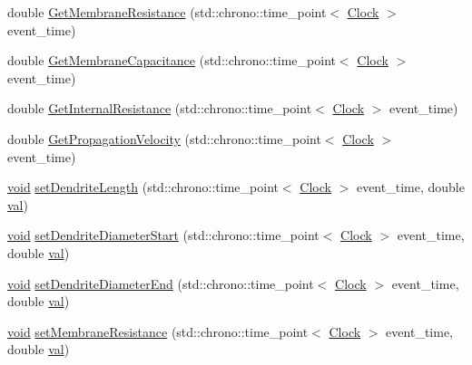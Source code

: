 \begin{DoxyCompactItemize}
\item 
double \mbox{\hyperlink{class_dendrite_ab70008318cada82e0f21f8f010858eaa}{Get\+Membrane\+Resistance}} (std\+::chrono\+::time\+\_\+point$<$ \mbox{\hyperlink{universe_8h_a0ef8d951d1ca5ab3cfaf7ab4c7a6fd80}{Clock}} $>$ event\+\_\+time)
\item 
double \mbox{\hyperlink{class_dendrite_a3551fe5fcf9c7ec767a6171f61a5ba51}{Get\+Membrane\+Capacitance}} (std\+::chrono\+::time\+\_\+point$<$ \mbox{\hyperlink{universe_8h_a0ef8d951d1ca5ab3cfaf7ab4c7a6fd80}{Clock}} $>$ event\+\_\+time)
\item 
double \mbox{\hyperlink{class_dendrite_a7dd00ac5440edf9943389951a275b9bc}{Get\+Internal\+Resistance}} (std\+::chrono\+::time\+\_\+point$<$ \mbox{\hyperlink{universe_8h_a0ef8d951d1ca5ab3cfaf7ab4c7a6fd80}{Clock}} $>$ event\+\_\+time)
\item 
double \mbox{\hyperlink{class_dendrite_af0315957a349532d25691385b6486e95}{Get\+Propagation\+Velocity}} (std\+::chrono\+::time\+\_\+point$<$ \mbox{\hyperlink{universe_8h_a0ef8d951d1ca5ab3cfaf7ab4c7a6fd80}{Clock}} $>$ event\+\_\+time)
\item 
\mbox{\hyperlink{glad_8h_a950fc91edb4504f62f1c577bf4727c29}{void}} \mbox{\hyperlink{class_dendrite_a9bc84d369ac487b095ed1641f89469d2}{set\+Dendrite\+Length}} (std\+::chrono\+::time\+\_\+point$<$ \mbox{\hyperlink{universe_8h_a0ef8d951d1ca5ab3cfaf7ab4c7a6fd80}{Clock}} $>$ event\+\_\+time, double \mbox{\hyperlink{glad_8h_a26942fd2ed566ef553eae82d2c109c8f}{val}})
\item 
\mbox{\hyperlink{glad_8h_a950fc91edb4504f62f1c577bf4727c29}{void}} \mbox{\hyperlink{class_dendrite_af33658a5420b56cfd321d75ae5784302}{set\+Dendrite\+Diameter\+Start}} (std\+::chrono\+::time\+\_\+point$<$ \mbox{\hyperlink{universe_8h_a0ef8d951d1ca5ab3cfaf7ab4c7a6fd80}{Clock}} $>$ event\+\_\+time, double \mbox{\hyperlink{glad_8h_a26942fd2ed566ef553eae82d2c109c8f}{val}})
\item 
\mbox{\hyperlink{glad_8h_a950fc91edb4504f62f1c577bf4727c29}{void}} \mbox{\hyperlink{class_dendrite_ada331daa4464ae007b3f77612aa46937}{set\+Dendrite\+Diameter\+End}} (std\+::chrono\+::time\+\_\+point$<$ \mbox{\hyperlink{universe_8h_a0ef8d951d1ca5ab3cfaf7ab4c7a6fd80}{Clock}} $>$ event\+\_\+time, double \mbox{\hyperlink{glad_8h_a26942fd2ed566ef553eae82d2c109c8f}{val}})
\item 
\mbox{\hyperlink{glad_8h_a950fc91edb4504f62f1c577bf4727c29}{void}} \mbox{\hyperlink{class_dendrite_af6141643bf2c85404ae9c320611d1d31}{set\+Membrane\+Resistance}} (std\+::chrono\+::time\+\_\+point$<$ \mbox{\hyperlink{universe_8h_a0ef8d951d1ca5ab3cfaf7ab4c7a6fd80}{Clock}} $>$ event\+\_\+time, double \mbox{\hyperlink{glad_8h_a26942fd2ed566ef553eae82d2c109c8f}{val}})

\end{DoxyCompactItemize}
